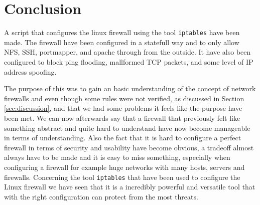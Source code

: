 \section{Conclusion} 
\label{sec:conclusion}
A script that configures the linux firewall using the tool \texttt{iptables} have been made. The firewall have been configured in a statefull way and to only allow NFS, SSH, portmapper, and apache through from the outside. It have also been configured to block ping flooding, mallformed TCP packets, and some level of IP address spoofing.

The purpose of this \lab{} was to gain an basic understanding of the concept of network firewalls and even though some rules were not verified, as discussed in Section \ref{sec:discussion}, and that we had some problems it feels like the purpose have been met. We can now afterwards say that a firewall that previously felt like something abstract and quite hard to understand have now become manageable in terms of understanding. Also the fact that it is hard to configure a perfect firewall in terms of security and usability have become obvious, a tradeoff almost always have to be made and it is easy to miss something, especially when configuring a firewall for example huge networks with many hosts, servers and firewalls. Concerning the tool \texttt{iptables} that have been used to configure the Linux firewall we have seen that it is a incredibly powerful and versatile tool that with the right configuration can protect from the most threats. 